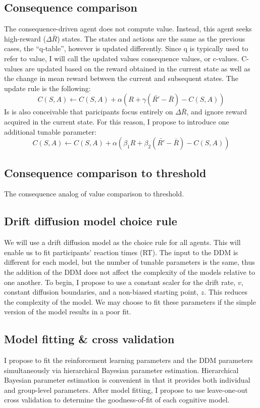 \documentclass[11pt]{article}
\begin{document}
\subsection{Consequence comparison}
\label{sec:org7e2102a}
The consequence-driven agent does not compute value. Instead, this agent seeks high-reward (\(\Delta\bar{R}\)) states.
The states and actions are the same as the previous cases, the ``q-table'', however is updated differently. Since q is typically used to refer to value, I will call the updated values consequence values, or c-values. C-values are updated based on the reward obtained in the current state as well as the change in mean reward between the current and subsequent states.
The update rule is the following:
\begin{equation}
C(S, A) \gets C(S, A) + \alpha (R + \gamma (\bar{R'} - \bar{R}) - C(S, A))
\end{equation}
Is is also conceivable that paricipants focus entirely on \(\Delta\bar{R}\), and ignore reward acquired in the current state. For this reason, I propose to introduce one additional tunable parameter:
\begin{equation}
C(S, A) \gets C(S, A) + \alpha (\beta_1 R + \beta_2 (\bar{R'} - \bar{R}) - C(S, A))
\end{equation}
\subsection{Consequence comparison to threshold}
\label{sec:orge48f254}
The consequence analog of value comparison to threshold.
\subsection{Drift diffusion model choice rule}
\label{sec:org61d8a30}
We will use a drift diffusion model as the choice rule for all agents. This will enable us to fit participants' reaction times (RT). The input to the DDM is different for each model, but the number of tunable parameters is the same, thus the addition of the DDM does not affect the complexity of the models relative to one another. To begin, I propose to use a constant scaler for the drift rate, \(v\), constant diffusion boundaries, and a non-biased starting point, \(z\). This reduces the complexity of the model. We may choose to fit these parameters if the simple version of the model results in a poor fit.
\subsection{Model fitting \& cross validation}
\label{sec:org3077a84}
I propose to fit the reinforcement learning parameters and the DDM parameters simultaneously via hierarchical Bayesian parameter estimation. Hierarchical Bayesian parameter estimation is convenient in that it provides both individual and group-level parameters.
After model fitting, I propose to use leave-one-out cross validation to determine the goodness-of-fit of each cognitive model.
\end{document}
